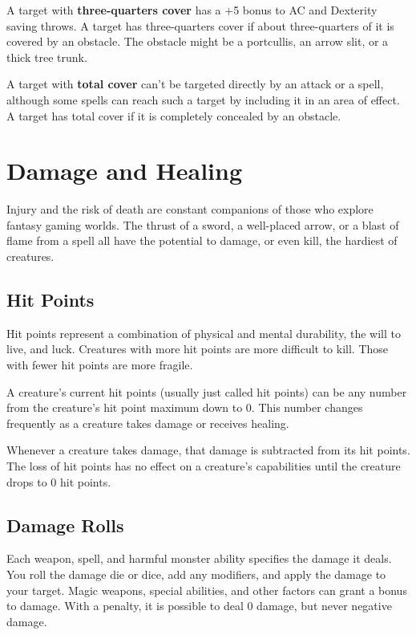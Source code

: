 A target with \textbf{three-quarters cover} has a +5 bonus to AC and Dexterity saving throws. A target has three-quarters cover if about three-quarters of it is covered by an obstacle. The obstacle might be a portcullis, an arrow slit, or a thick tree trunk.

A target with \textbf{total cover} can't be targeted directly by an attack or a spell, although some spells can reach such a target by including it in an area of effect. A target has total cover if it is completely concealed by an obstacle.

\section{Damage and Healing}

Injury and the risk of death are constant companions of those who explore fantasy gaming worlds. The thrust of a sword, a well-placed arrow, or a blast of flame from a  spell all have the potential to damage, or even kill, the hardiest of creatures.

\subsection{Hit Points}

Hit points represent a combination of physical and mental durability, the will to live, and luck. Creatures with more hit points are more difficult to kill. Those with fewer hit points are more fragile.

A creature's current hit points (usually just called hit points) can be any number from the creature's hit point maximum down to 0. This number changes frequently as a creature takes damage or receives healing.

Whenever a creature takes damage, that damage is subtracted from its hit points. The loss of hit points has no effect on a creature's capabilities until the creature drops to 0 hit points.

\subsection{Damage Rolls}

Each weapon, spell, and harmful monster ability specifies the damage it deals. You roll the damage die or dice, add any modifiers, and apply the damage to your target. Magic weapons, special abilities, and other factors can grant a bonus to damage. With a penalty, it is possible to deal 0 damage, but never negative damage.

